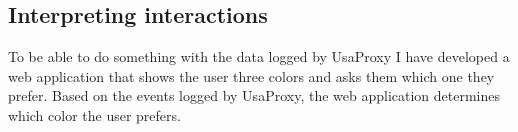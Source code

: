 \subsection{Interpreting interactions}
To be able to do something with the data logged by UsaProxy I have developed a web application that shows the user three colors and asks them which one they prefer. Based on the events logged by UsaProxy, the web application determines which color the user prefers. 